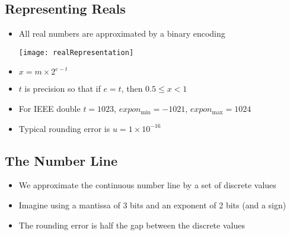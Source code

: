 
\begin{slide}
\section{Representing Reals}

\begin{PauseHighLight}
  \begin{itemize}
  \item All real numbers are approximated by a binary encoding
    \begin{center}
      \texttt{[image: realRepresentation]}\pause
    \end{center}
  \item $x = m \times 2^{e-t}$\pause
  \item $t$ is precision so that if $e=t$, then $0.5 \leq x < 1$\pause
  \item For IEEE double $t=1023$, $expon_{\min} = -1021$, $expon_{\max}=1024$\pause
  \item Typical rounding error is $u=1\times10^{-16}$\pause
  \end{itemize}
\end{PauseHighLight}

\end{slide}


\begin{slide}
\section[-1]{The Number Line}

\pb
\begin{itemize}
\item We approximate the continuous number line by a set of discrete
  values\pauseh
\item Imagine using a mantissa of 3 bits and an exponent of 2 bits (and
  a sign)\pauseh
\end{itemize}
\begin{center}
  \pauseb
\end{center}
\begin{itemize}
\item The rounding error is half the gap between the discrete values\pauseh
\end{itemize}

\end{slide}

